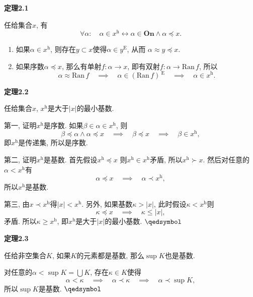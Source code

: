 \documentclass[UTF8]{ctexart}
\begin{document}
\vspace{10pt}

\hypertarget{sec:定理2.1}{}
\noindent\textbf{定理2.1}

任给集合$x$, 有
\[
    \forall\alpha:\quad\alpha\in x^{\mathrm{h}}\leftrightarrow
    \alpha\in\mathbf{On}\land\alpha\preccurlyeq x.
\]


\begin{enumerate}
    \item 如果$\alpha\in x^{\mathrm{h}}$,
    则存在$y\subset x$使得$\alpha\in y^{\mathrm{E}}$, 从而
    $\alpha\approx y\preccurlyeq x$.
    \item 如果序数$\alpha\preccurlyeq x$, 那么有单射$f:\alpha\to x$,
    即有双射$f:\alpha\to\mathrm{Ran}\,f$, 所以
    \begin{equation*}
        \alpha\approx\mathrm{Ran}\,f\quad\implies\quad
        \alpha\in(\mathrm{Ran}\,f)\,^{\mathrm{E}}\quad\implies\quad
        \alpha\in x^{\mathrm{h}}.
    \tag*{\qedsymbol}\end{equation*}
\end{enumerate}

\vspace{10pt}

\hypertarget{sec:定理2.2}{}
\noindent\textbf{定理2.2}

任给集合$x$, $x^{\mathrm{h}}$是大于$|x|$的最小基数.


第一, 证明$x^{\mathrm{h}}$是序数. 如果$\beta\in\alpha\in x^{\mathrm{h}}$, 则
\[
    \beta\preccurlyeq\alpha\land\alpha\preccurlyeq x
    \quad\implies\quad\beta\preccurlyeq x
    \quad\implies\quad\beta\in x^{\mathrm{h}},
\]
即$x^{\mathrm{h}}$是传递集, 所以是序数.

第二, 证明$x^{\mathrm{h}}$是基数. 首先假设$x^{\mathrm{h}}\preccurlyeq x$
则$x^{\mathrm{h}}\in x^{\mathrm{h}}$矛盾, 所以$x^{\mathrm{h}}\succ x$.
然后对任意的$\alpha<x^{\mathrm{h}}$有
\[
    \alpha\preccurlyeq x\quad\implies\quad\alpha\prec x^{\mathrm{h}},
\]
所以$x^{\mathrm{h}}$是基数.

第三, 由$x\prec x^{\mathrm{h}}$得$|x|<x^{\mathrm{h}}$.
另外, 如果基数$\kappa>|x|$, 此时假设$\kappa<x^{\mathrm{h}}$则
\[
    \kappa\preccurlyeq x\quad\implies\quad\kappa\leqslant|x|,
\]
矛盾. 所以$\kappa\geqslant x^{\mathrm{h}}$,
即$x^{\mathrm{h}}$是大于$|x|$的最小基数. \hfill $\qedsymbol$

\vspace{15pt}

\hypertarget{sec:定理2.3}{}
\noindent\textbf{定理2.3}

任给非空集合$K$, 如果$K$的元素都是基数, 那么$\sup K$也是基数.


对任意的$\displaystyle\alpha<\sup K=\bigcup K$, 存在$\kappa\in K$使得
\[
    \alpha<\kappa\quad\implies\quad\alpha\prec\kappa
    \quad\implies\quad\alpha\prec\sup K,
\]
所以$\sup K$是基数. \hfill $\qedsymbol$
\end{document}
